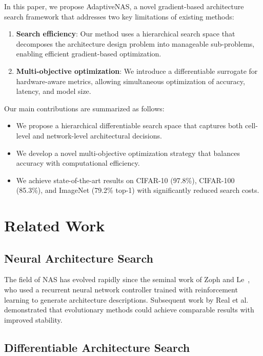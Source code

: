 \documentclass[12pt]{article}
\begin{document}
In this paper, we propose AdaptiveNAS, a novel gradient-based architecture search framework that addresses two key limitations of existing methods:

\begin{enumerate}[label=(\roman*)]
  \item \textbf{Search efficiency}: Our method uses a hierarchical search space that decomposes the architecture design problem into manageable sub-problems, enabling efficient gradient-based optimization.
  \item \textbf{Multi-objective optimization}: We introduce a differentiable surrogate for hardware-aware metrics, allowing simultaneous optimization of accuracy, latency, and model size.
\end{enumerate}

Our main contributions are summarized as follows:
\begin{itemize}
  \item We propose a hierarchical differentiable search space that captures both cell-level and network-level architectural decisions.
  \item We develop a novel multi-objective optimization strategy that balances accuracy with computational efficiency.
  \item We achieve state-of-the-art results on CIFAR-10 (97.8\%), CIFAR-100 (85.3\%), and ImageNet (79.2\% top-1) with significantly reduced search costs.
\end{itemize}

\section{Related Work}

\subsection{Neural Architecture Search}

The field of NAS has evolved rapidly since the seminal work of Zoph and Le~\citep{zoph2017neural}, who used a recurrent neural network controller trained with reinforcement learning to generate architecture descriptions. Subsequent work by Real et al.~\citep{real2019regularized} demonstrated that evolutionary methods could achieve comparable results with improved stability.

\subsection{Differentiable Architecture Search}
\end{document}
